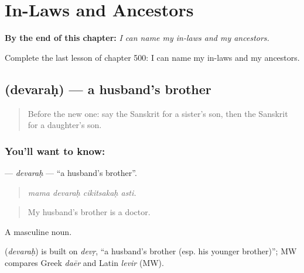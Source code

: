 
\chapter{In-Laws and Ancestors}
\label{ch:sa-in-laws-and-ancestors}

\begin{chapteropening}
\textbf{By the end of this chapter:} \emph{I can name my in-laws and my ancestors.}

Complete the last lesson of chapter 500: I can name my in-laws and my ancestors.
\end{chapteropening}

\section[\texorpdfstring{\sk{देवरः} (devaraḥ)}{देवरः (devaraḥ)}]{ (devaraḥ) — a husband's brother}

\label{lesson:SA-C500-devarah}



\begin{quote}
Before the new one: say the Sanskrit for a sister's son, then the Sanskrit for a daughter's son.
\end{quote}

\subsection*{You'll want to know: }
\textbf{} — \emph{devaraḥ} — \textquotedblleft{}a husband's brother\textquotedblright{}.

\begin{quote}
   
\end{quote}

\begin{quote}
\emph{mama devaraḥ cikitsakaḥ asti.}
\end{quote}

\begin{quote}
My husband's brother is a doctor.
\end{quote}

A masculine noun.

\begin{cousinweb}
\textbf{} (\emph{devaraḥ}) is built on \emph{devṛ}, \textquotedblleft{}a husband's brother (esp. his younger brother)\textquotedblright{}; MW compares Greek \emph{daēr} and Latin \emph{levir} (MW).
\end{cousinweb}

